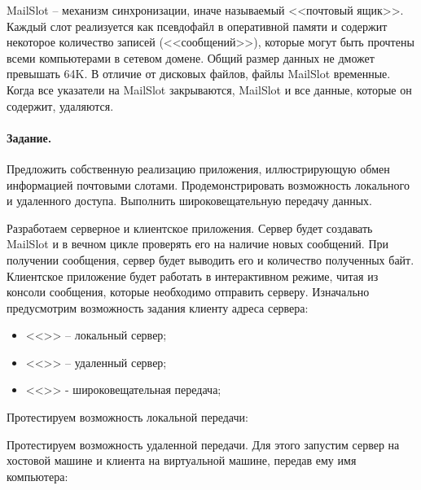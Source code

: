 MailSlot -- механизм синхронизации, иначе называемый <<почтовый ящик>>. Каждый слот реализуется как псевдофайл в оперативной памяти и содержит некоторое количество записей (<<сообщений>>), которые могут быть прочтены всеми компьютерами в сетевом домене. Общий размер данных не дможет превышать 64K. В отличие от дисковых файлов, файлы MailSlot временные. Когда все указатели на MailSlot закрываются, MailSlot и все данные, которые он содержит, удаляются.

\paragraph{Задание.} Предложить собственную реализацию приложения, иллюстрирующую обмен информацией почтовыми слотами. Продемонстрировать возможность локального и удаленного доступа. Выполнить широковещательную передачу данных.

Разработаем серверное и клиентское приложения. Сервер будет создавать MailSlot и в вечном цикле проверять его на наличие новых сообщений. При получении сообщения, сервер будет выводить его и количество полученных байт. Клиентское приложение будет работать в интерактивном режиме, читая из консоли сообщения, которые необходимо отправить серверу. Изначально предусмотрим возможность задания клиенту адреса сервера:
\begin{itemize}
	\item <<{\Large{}}>> -- локальный сервер;
	\item <<>> -- удаленный сервер;
	\item <<\code{*}>> - широковещательная передача;
\end{itemize} 





Протестируем возможность локальной передачи:





Протестируем возможность удаленной передачи. Для этого запустим сервер на хостовой машине и клиента на виртуальной машине, передав ему имя компьютера:






